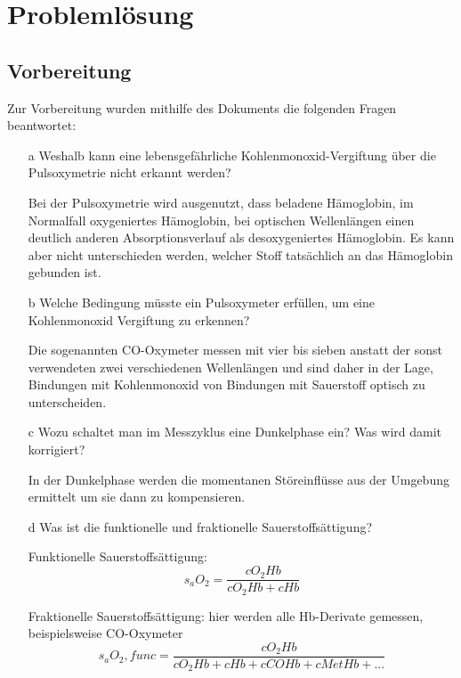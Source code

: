 \documentclass[11pt]{scrartcl}
\begin{document}
    \section{Problemlösung}

    \subsection{Vorbereitung}
    Zur Vorbereitung wurden mithilfe des Dokuments \cite{Pulsoxymetrie} die folgenden Fragen beantwortet:
    
    \begin{itemize}
        \item[a]  Weshalb kann eine lebensgefährliche Kohlenmonoxid-Vergiftung über die
        Pulsoxymetrie nicht erkannt werden?
        \item[] Bei der Pulsoxymetrie wird ausgenutzt, dass beladene Hämoglobin, im Normalfall oxygeniertes
        Hämoglobin, bei optischen Wellenlängen einen deutlich anderen Absorptionsverlauf als desoxygeniertes Hämoglobin.
        Es kann aber nicht unterschieden werden, welcher Stoff tatsächlich an das Hämoglobin gebunden ist.
        \item[b] Welche Bedingung müsste ein Pulsoxymeter erfüllen, um eine Kohlenmonoxid Vergiftung zu erkennen?
        \item[]  Die sogenannten CO-Oxymeter messen mit vier bis sieben anstatt der sonst verwendeten zwei
        verschiedenen Wellenlängen und sind daher in der Lage, Bindungen mit Kohlenmonoxid von Bindungen mit Sauerstoff optisch zu unterscheiden.
        \item[c] Wozu schaltet man im Messzyklus eine Dunkelphase ein? Was wird damit korrigiert?
        \item[] In der Dunkelphase werden die momentanen Störeinflüsse aus der Umgebung ermittelt um sie dann zu
        kompensieren.
        \item[d] Was ist die funktionelle und fraktionelle Sauerstoffsättigung?
        \item[] Funktionelle Sauerstoffsättigung: 
        \begin{equation}
            s_aO_2 = \frac{cO_2Hb}{cO_2Hb + cHb} 
        \end{equation}
        \item[] Fraktionelle Sauerstoffsättigung: hier werden alle Hb-Derivate gemessen, beispielsweise CO-Oxymeter
        \begin{equation}
            s_aO_2,func = \frac{cO_2Hb}{cO_2Hb + cHb + cCOHb + cMetHb + ...} 

\end{equation}
\end{itemize}
\end{document}
